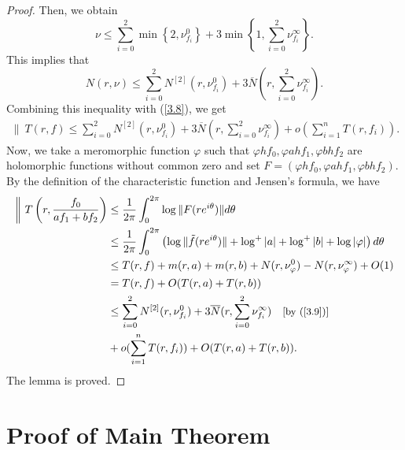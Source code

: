 \documentclass[12pt,leqno]{amsart}
\numberwithin{equation}{section}
\begin{document}
\begin{proof}
Then, we obtain
$$\nu\le \sum_{i=0}^2\min\left\{2,\nu^0_{f_i}\right\}+3\min\left\{1,\sum_{i=0}^2\nu^\infty_{f_i}\right\}.$$
This implies that
$$ N(r,\nu)\le\sum_{i=0}^2N^{[2]}(r,\nu^0_{f_i})+3\overline N\left(r,\sum_{i=0}^2\nu^\infty_{f_i}\right).$$
Combining this inequality with (\ref{3.8}), we get
\begin{align}\label{3.9}
\|\ T(r,f)\le \sum_{i=0}^2N^{[2]}(r,\nu^0_{f_i})+3\overline N(r,\sum_{i=0}^2\nu^\infty_{f_i})+o(\sum_{i=1}^nT(r,f_i)). 
\end{align}
Now, we take a meromorphic function $\varphi$ such that $\varphi hf_0,\varphi ahf_1,\varphi bhf_2$ are holomorphic functions without common zero and set $F=(\varphi hf_0,\varphi ahf_1,\varphi bhf_2)$. By the definition of the characteristic function and Jensen's formula, we have
\begin{align*}
\biggl\|\ T\left(r,\frac{f_0}{af_1+bf_2}\right)&\le\frac{1}{2\pi}\int_0^{2\pi}\log\|F(re^{i\theta})\|d\theta\\
&\le \frac{1}{2\pi}\int_0^{2\pi}\left(\log\|\tilde f(re^{i\theta})\|+\log^+|a|+\log^+|b|+\log |\varphi|\right)d\theta\\
&\le T(r,f)+m(r,a)+m(r,b)+N(r,\nu^0_\varphi)-N(r,\nu^\infty_\varphi)+O(1)\\
&=T(r,f)+O(T(r,a)+T(r,b))\\
&\le \sum_{i=0}^2N^{[2]}(r,\nu^0_{f_i})+3\overline N(r,\sum_{i=0}^2\nu^\infty_{f_i})\ \ \ \text{\small[by (\ref{3.9})]}\\
&+o(\sum_{i=1}^nT(r,f_i))+O(T(r,a)+T(r,b)).
\end{align*}
The lemma is proved.
\end{proof}
\section{Proof of Main Theorem}
\end{document}
